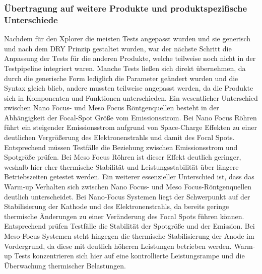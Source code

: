 \documentclass[12pt]{article} %
\begin{document}
\subsubsection{Übertragung auf weitere Produkte und produktspezifische Unterschiede}
Nachdem für den Xplorer die meisten Tests angepasst wurden und sie generisch und nach dem DRY Prinzip gestaltet wurden, war der nächste Schritt die Anpassung der Tests für die anderen Produkte, welche teilweise noch nicht in der Testpipeline integriert waren.
Manche Tests ließen sich direkt übernehmen, da durch die generische Form lediglich die Parameter geändert wurden und die Syntax gleich blieb, andere mussten teilweise angepasst werden, da die Produkte sich in Komponenten und Funktionen unterschieden.
Ein wesentlicher Unterschied zwischen Nano Focus- und Meso Focus Röntgenquellen besteht in der Abhängigkeit der Focal-Spot Größe vom Emissionsstrom. Bei Nano Focus Röhren führt ein steigender Emissionsstrom aufgrund von Space-Charge Effekten zu einer deutlichen Vergrößerung des Elektronenstrahls und damit des Focal Spots.
Entsprechend müssen Testfälle die Beziehung zwischen Emissionsstrom und Spotgröße prüfen. Bei Meso Focus Röhren ist dieser Effekt deutlich geringer, weshalb hier eher thermische Stabilität und Leistungsstabilität über längere Betriebszeiten getestet werden.
Ein weiterer essenzieller Unterschied ist, dass das Warm-up Verhalten sich zwischen Nano Focus- und Meso Focus-Röntgenquellen deutlich unterscheidet. Bei Nano-Focus Systemen liegt der Schwerpunkt auf der Stabilisierung der Kathode und des Elektronenstrahls, da bereits geringe thermische Änderungen zu einer Veränderung des Focal Spots führen können. Entsprechend prüfen Testfälle die Stabilität der Spotgröße und der Emission.
Bei Meso-Focus Systemen steht hingegen die thermische Stabilisierung der Anode im Vordergrund, da diese mit deutlich höheren Leistungen betrieben werden. Warm-up Tests konzentrieren sich hier auf eine kontrollierte Leistungsrampe und die Überwachung thermischer Belastungen.
\\
\\
\end{document}
